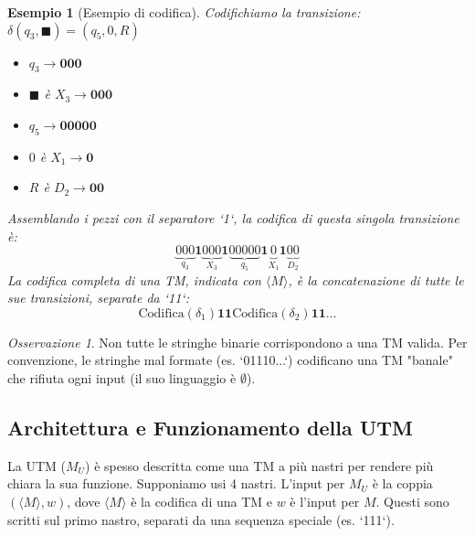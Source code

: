 \documentclass[a4paper]{article}
\newtheorem{example}{Esempio}
\theoremstyle{remark} %
\newtheorem{remark}{Osservazione}
\begin{document}
\begin{example}[Esempio di codifica]
Codifichiamo la transizione: $\delta(q_3, \blacksquare) = (q_5, 0, R)$
\begin{itemize}
    \item $q_3 \rightarrow \textbf{000}$
    \item $\blacksquare$ è $X_3 \rightarrow \textbf{000}$
    \item $q_5 \rightarrow \textbf{00000}$
    \item $0$ è $X_1 \rightarrow \textbf{0}$
    \item $R$ è $D_2 \rightarrow \textbf{00}$
\end{itemize}
Assemblando i pezzi con il separatore `1`, la codifica di questa singola transizione è:
\[ \underbrace{000}_{q_3} \mathbf{1} \underbrace{000}_{X_3} \mathbf{1} \underbrace{00000}_{q_5} \mathbf{1} \underbrace{0}_{X_1} \mathbf{1} \underbrace{00}_{D_2} \]
La codifica completa di una TM, indicata con $\langle M \rangle$, è la concatenazione di tutte le sue transizioni, separate da `11`:
\[ \text{Codifica}(\delta_1) \mathbf{11} \text{Codifica}(\delta_2) \mathbf{11} \dots \]
\end{example}

\begin{remark}
Non tutte le stringhe binarie corrispondono a una TM valida. Per convenzione, le stringhe mal formate (es. `01110...`) codificano una TM "banale" che rifiuta ogni input (il suo linguaggio è $\emptyset$).
\end{remark}

\subsection{Architettura e Funzionamento della UTM}

La UTM ($M_U$) è spesso descritta come una TM a più nastri per rendere più chiara la sua funzione. Supponiamo usi 4 nastri. L'input per $M_U$ è la coppia $(\langle M \rangle, w)$, dove $\langle M \rangle$ è la codifica di una TM e $w$ è l'input per $M$. Questi sono scritti sul primo nastro, separati da una sequenza speciale (es. `111`).
\end{document}
